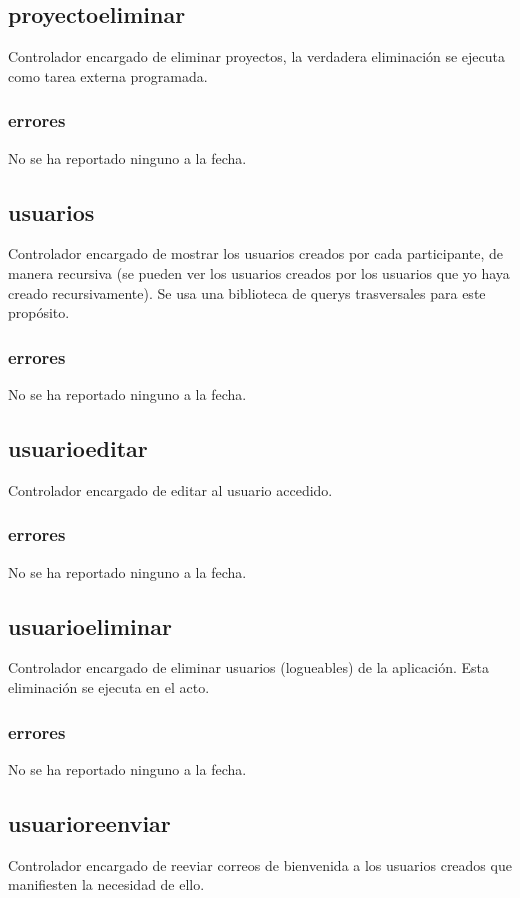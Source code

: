 \documentclass[10pt,a4paper]{book}
\begin{document}
	\subsection{proyectoeliminar}
	Controlador encargado de eliminar proyectos, la verdadera eliminación se ejecuta como tarea externa programada.
	\subsubsection{errores}
	No se ha reportado ninguno a la fecha.

	\subsection{usuarios}
	Controlador encargado de mostrar los usuarios creados por cada participante, de manera recursiva (se pueden ver los usuarios creados por los usuarios que yo haya creado recursivamente). Se usa una biblioteca de querys trasversales para este propósito.
	\subsubsection{errores}
	No se ha reportado ninguno a la fecha.

	\subsection{usuarioeditar}
	Controlador encargado de editar al usuario accedido.
	\subsubsection{errores}
	No se ha reportado ninguno a la fecha.

	\subsection{usuarioeliminar}
	Controlador encargado de eliminar usuarios (logueables) de la aplicación. Esta eliminación se ejecuta en el acto.
	\subsubsection{errores}
	No se ha reportado ninguno a la fecha.

	\subsection{usuarioreenviar}
	Controlador encargado de reeviar correos de bienvenida a los usuarios creados que manifiesten la necesidad de ello.
\end{document}
